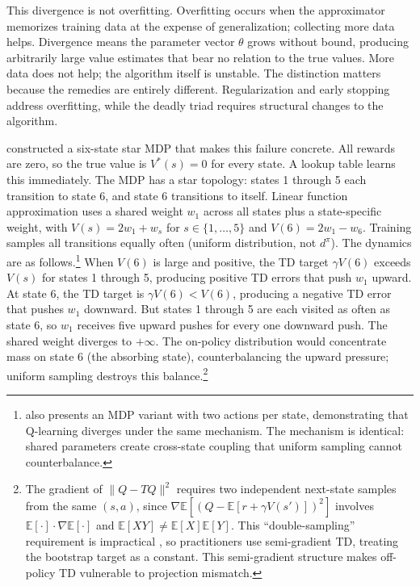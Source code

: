 This divergence is not overfitting. Overfitting occurs when the approximator memorizes training data at the expense of generalization; collecting more data helps. Divergence means the parameter vector $\theta$ grows without bound, producing arbitrarily large value estimates that bear no relation to the true values. More data does not help; the algorithm itself is unstable. The distinction matters because the remedies are entirely different. Regularization and early stopping address overfitting, while the deadly triad requires structural changes to the algorithm.

\citet{Baird1995} constructed a six-state star MDP that makes this failure concrete. All rewards are zero, so the true value is $V^*(s) = 0$ for every state. A lookup table learns this immediately. The MDP has a star topology: states 1 through 5 each transition to state 6, and state 6 transitions to itself. Linear function approximation uses a shared weight $w_1$ across all states plus a state-specific weight, with $V(s) = 2w_1 + w_s$ for $s \in \{1,\ldots,5\}$ and $V(6) = 2w_1 - w_6$. Training samples all transitions equally often (uniform distribution, not $d^\pi$). The dynamics are as follows.\footnote{\citet{Baird1995} also presents an MDP variant with two actions per state, demonstrating that Q-learning diverges under the same mechanism. The mechanism is identical: shared parameters create cross-state coupling that uniform sampling cannot counterbalance.} When $V(6)$ is large and positive, the TD target $\gamma V(6)$ exceeds $V(s)$ for states 1 through 5, producing positive TD errors that push $w_1$ upward. At state 6, the TD target is $\gamma V(6) < V(6)$, producing a negative TD error that pushes $w_1$ downward. But states 1 through 5 are each visited as often as state 6, so $w_1$ receives five upward pushes for every one downward push. The shared weight diverges to $+\infty$. The on-policy distribution would concentrate mass on state 6 (the absorbing state), counterbalancing the upward pressure; uniform sampling destroys this balance.\footnote{The gradient of $\|Q - TQ\|^2$ requires two independent next-state samples from the same $(s,a)$, since $\nabla\mathbb{E}[(Q - \mathbb{E}[r + \gamma V(s')])^2]$ involves $\mathbb{E}[\cdot] \cdot \nabla\mathbb{E}[\cdot]$ and $\mathbb{E}[XY] \neq \mathbb{E}[X]\mathbb{E}[Y]$. This ``double-sampling'' requirement is impractical \citep{Baird1995}, so practitioners use semi-gradient TD, treating the bootstrap target as a constant. This semi-gradient structure makes off-policy TD vulnerable to projection mismatch.}

